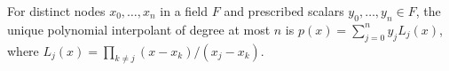 
For distinct nodes $x_0,\ldots,x_n$ in a field $F$ and prescribed scalars $y_0,\ldots,y_n\in F$, the unique polynomial interpolant of degree at most $n$ is $p(x)=\sum_{j=0}^ny_jL_j(x)$, where $L_j(x)=\prod_{k\ne j}(x-x_k)/(x_j-x_k)$.
